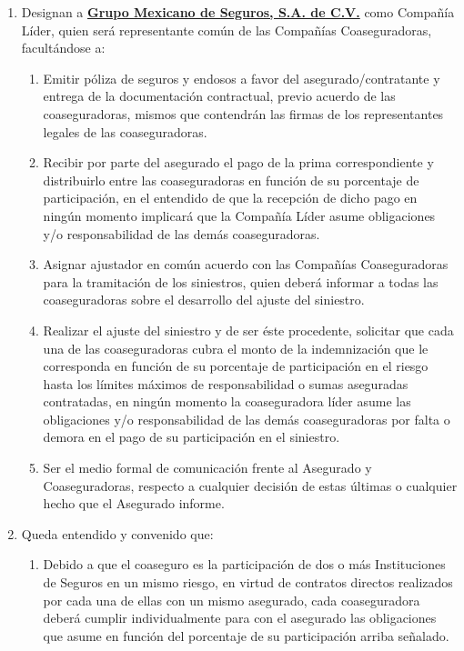 ﻿\documentclass[letterpaper,10pt]{article}
\begin{document}
\renewcommand{\labelenumii}{\roman{enumii}}
\begin{enumerate}
    \item Designan a \textbf{\underline{Grupo Mexicano de Seguros, S.A. de C.V.}} como Compañía Líder, quien será representante común de las Compañías Coaseguradoras, facultándose a:
        \begin{enumerate}
            \item Emitir póliza de seguros y endosos a favor del asegurado/contratante y entrega de la documentación contractual, previo acuerdo de las coaseguradoras, mismos que contendrán las firmas de los representantes legales de las coaseguradoras.
            \item Recibir por parte del asegurado el pago de la prima correspondiente y distribuirlo entre las coaseguradoras en función de su porcentaje de participación, en el entendido de que la recepción de dicho pago en ningún momento implicará que la Compañía Líder asume obligaciones y/o responsabilidad de las demás coaseguradoras.
            \item Asignar ajustador en común acuerdo con las Compañías Coaseguradoras para la tramitación de los siniestros, quien deberá informar a todas las coaseguradoras sobre el desarrollo del ajuste del siniestro.
            \item Realizar el ajuste del siniestro y de ser éste procedente, solicitar que cada una de las coaseguradoras cubra el monto de la indemnización que le corresponda en función de su porcentaje de participación en el riesgo hasta los límites máximos de responsabilidad o sumas aseguradas contratadas, en ningún momento la coaseguradora líder asume las obligaciones y/o responsabilidad de las demás coaseguradoras por falta o demora en el pago de su participación en el siniestro.
            \item Ser el medio formal de comunicación frente al Asegurado y Coaseguradoras, respecto a cualquier decisión de estas últimas o cualquier hecho que el Asegurado informe.
        \end{enumerate}
    \item Queda entendido y convenido que:
        \renewcommand{\labelenumii}{\alph{enumii}}
        \begin{enumerate}
            \item Debido a que el coaseguro es la participación de dos o más Instituciones de Seguros en un mismo riesgo, en virtud de contratos directos realizados por cada una de ellas con un mismo asegurado, cada coaseguradora deberá cumplir individualmente para con el asegurado las obligaciones que asume en función del porcentaje de su participación arriba señalado.

\end{enumerate}
\end{enumerate}
\end{document}
